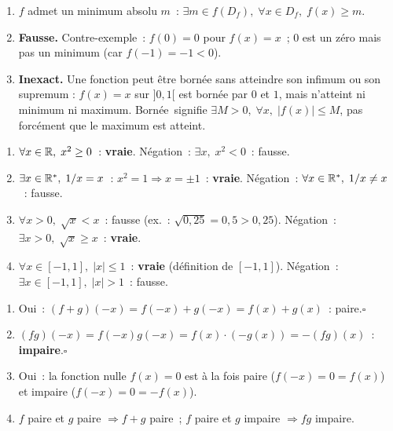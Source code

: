 
\begin{enumerate}
  \item \og $f$ admet un minimum absolu $m$\fg~:
        $\exists m\in f(D_f),\;\forall x\in D_f,\;f(x)\geq m$.
  \item \textbf{Fausse.} Contre-exemple~: $f(0)=0$ pour $f(x)=x$~;
        $0$ est un z\'ero mais pas un minimum (car $f(-1)=-1<0$).
  \item \textbf{Inexact.} Une fonction peut \^etre born\'ee sans atteindre son infimum ou
        son supremum : $f(x)=x$ sur $]0,1[$ est born\'ee par $0$ et $1$,
        mais n'atteint ni minimum ni maximum. \og Born\'ee\fg\ signifie $\exists M>0,\;\forall x,\;|f(x)|\leq M$,
        pas forc\'ement que le maximum est atteint.
\end{enumerate}


\begin{enumerate}
  \item $\forall x\in\mathbb{R},\;x^2\geq0$~: \textbf{vraie}. N\'egation~: $\exists x,\;x^2<0$~: fausse.
  \item $\exists x\in\mathbb{R}^*,\;1/x=x$~: $x^2=1\Rightarrow x=\pm1$~: \textbf{vraie}.
        N\'egation~: $\forall x\in\mathbb{R}^*,\;1/x\ne x$~: fausse.
  \item $\forall x>0,\;\sqrt{x}<x$~: fausse (ex.~: $\sqrt{0{,}25}=0{,}5>0{,}25$).
        N\'egation~: $\exists x>0,\;\sqrt{x}\geq x$~: \textbf{vraie}.
  \item $\forall x\in[-1,1],\;|x|\leq1$~: \textbf{vraie} (d\'efinition de $[-1,1]$).
        N\'egation~: $\exists x\in[-1,1],\;|x|>1$~: fausse.
\end{enumerate}


\begin{enumerate}
  \item Oui~: $(f+g)(-x)=f(-x)+g(-x)=f(x)+g(x)$~: paire.\hfill$\square$
  \item $(fg)(-x)=f(-x)g(-x)=f(x)\cdot(-g(x))=-(fg)(x)$~: \textbf{impaire}.\hfill$\square$
  \item Oui~: la fonction nulle $f(x)=0$ est \`a la fois paire ($f(-x)=0=f(x)$)
        et impaire ($f(-x)=0=-f(x)$).
  \item \og $f$ paire et $g$ paire $\Rightarrow f+g$ paire\fg~; \og $f$ paire et $g$ impaire $\Rightarrow fg$ impaire\fg.
\end{enumerate}

